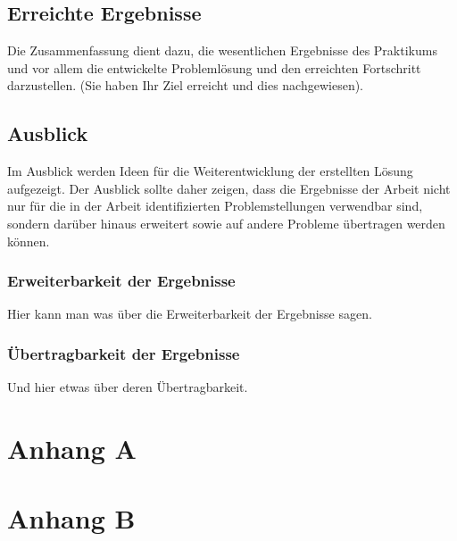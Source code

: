 \documentclass[oneside]{ausarbeitung}
\begin{document}
\section{Erreichte Ergebnisse}
\label{sec:ergebnisse}

Die Zusammenfassung dient dazu, die wesentlichen Ergebnisse des 
Praktikums und vor allem die entwickelte Problemlösung und den 
erreichten Fortschritt darzustellen. (Sie haben Ihr Ziel erreicht und 
dies nachgewiesen).

\section{Ausblick}
\label{sec:ausblick}

Im Ausblick werden Ideen für die Weiterentwicklung der erstellten Lösung 
aufgezeigt. Der Ausblick sollte daher zeigen, dass die Ergebnisse der 
Arbeit nicht nur für die in der Arbeit identifizierten Problemstellungen 
verwendbar sind, sondern darüber hinaus erweitert sowie auf andere 
Probleme übertragen werden können.

\subsection{Erweiterbarkeit der Ergebnisse}
\label{sub:erweiterbarkeit}

Hier kann man was über die Erweiterbarkeit der Ergebnisse sagen.

\subsection{Übertragbarkeit der Ergebnisse}
\label{sub:uebertragbarkeit}

Und hier etwas über deren Übertragbarkeit.

\appendix

\printbibliography[heading=bibintoc]

\chapter{Anhang A}

\Blindtext

\chapter{Anhang B}

\Blindtext
\end{document}
